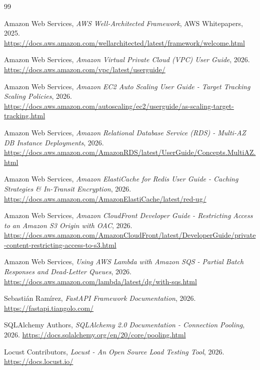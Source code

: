 \begin{thebibliography}{99}

Amazon Web Services, \textit{AWS Well-Architected Framework}, AWS Whitepapers, 2025.
\url{https://docs.aws.amazon.com/wellarchitected/latest/framework/welcome.html}

Amazon Web Services, \textit{Amazon Virtual Private Cloud (VPC) User Guide}, 2026.
\url{https://docs.aws.amazon.com/vpc/latest/userguide/}

Amazon Web Services, \textit{Amazon EC2 Auto Scaling User Guide - Target Tracking Scaling Policies}, 2026.
\url{https://docs.aws.amazon.com/autoscaling/ec2/userguide/as-scaling-target-tracking.html}

Amazon Web Services, \textit{Amazon Relational Database Service (RDS) - Multi-AZ DB Instance Deployments}, 2026.
\url{https://docs.aws.amazon.com/AmazonRDS/latest/UserGuide/Concepts.MultiAZ.html}

Amazon Web Services, \textit{Amazon ElastiCache for Redis User Guide - Caching Strategies \& In-Transit Encryption}, 2026.
\url{https://docs.aws.amazon.com/AmazonElastiCache/latest/red-ug/}

Amazon Web Services, \textit{Amazon CloudFront Developer Guide - Restricting Access to an Amazon S3 Origin with OAC}, 2026.
\url{https://docs.aws.amazon.com/AmazonCloudFront/latest/DeveloperGuide/private-content-restricting-access-to-s3.html}

Amazon Web Services, \textit{Using AWS Lambda with Amazon SQS - Partial Batch Responses and Dead-Letter Queues}, 2026.
\url{https://docs.aws.amazon.com/lambda/latest/dg/with-sqs.html}

Sebastián Ramírez, \textit{FastAPI Framework Documentation}, 2026.
\url{https://fastapi.tiangolo.com/}

SQLAlchemy Authors, \textit{SQLAlchemy 2.0 Documentation - Connection Pooling}, 2026.
\url{https://docs.sqlalchemy.org/en/20/core/pooling.html}

Locust Contributors, \textit{Locust - An Open Source Load Testing Tool}, 2026.
\url{https://docs.locust.io/}

\end{thebibliography}
